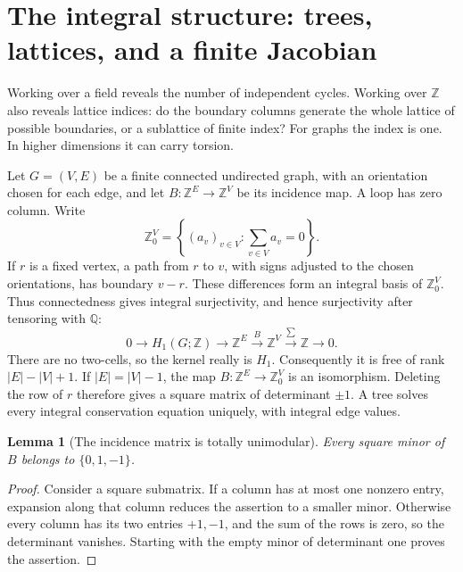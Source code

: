 \documentclass[11pt]{article}
\newtheorem{lemma}[theorem]{Lemma}
\theoremstyle{definition}
\theoremstyle{remark}
\newcommand{\Q}{\mathbb Q}
\newcommand{\Z}{\mathbb Z}
\newcommand{\R}{\mathbb R}
\newcommand{\C}{\mathbb C}
\begin{document}

\section{The integral structure: trees, lattices, and a finite Jacobian}
\label{sec:gih-integral}

Working over a field reveals the number of independent cycles. Working over
\(\Z\) also reveals lattice indices: do the boundary columns generate the
whole lattice of possible boundaries, or a sublattice of finite index?
For graphs the index is one. In higher dimensions it can carry torsion.

Let \(G=(V,E)\) be a finite connected undirected graph, with an orientation
chosen for each edge, and let \(B:\Z^E\to\Z^V\) be its incidence map.
A loop has zero column.  Write
\[
 \Z^V_0=\left\{(a_v)_{v\in V}:\sum_{v\in V}a_v=0\right\}.
\]
If \(r\) is a fixed vertex, a path from \(r\) to \(v\), with signs adjusted
to the chosen orientations, has boundary \(v-r\).  These differences form
an integral basis of \(\Z^V_0\).  Thus connectedness gives integral
surjectivity, and hence surjectivity after tensoring with \(\Q\):
\begin{equation}
 0\longrightarrow H_1(G;\Z)\longrightarrow\Z^E
 \xrightarrow{B}\Z^V\xrightarrow{\sum}\Z\longrightarrow0.
 \label{eq:gih-integral-sequence}
\end{equation}
There are no two-cells, so the kernel really is \(H_1\).  Consequently it
is free of rank \(|E|-|V|+1\).  If \(|E|=|V|-1\), the map
\(B:\Z^E\to\Z^V_0\) is an isomorphism.  Deleting the row of \(r\)
therefore gives a square matrix of determinant \(\pm1\).  A tree solves
every integral conservation equation uniquely, with integral edge values.

\begin{lemma}[The incidence matrix is totally unimodular]
Every square minor of \(B\) belongs to \(\{0,1,-1\}\).
\end{lemma}
\begin{proof}
Consider a square submatrix.  If a column has at most one nonzero entry,
expansion along that column reduces the assertion to a smaller minor.
Otherwise every column has its two entries \(+1,-1\), and the sum of the
rows is zero, so the determinant vanishes.  Starting with the empty minor
of determinant one proves the assertion.
\end{proof}
\end{document}
